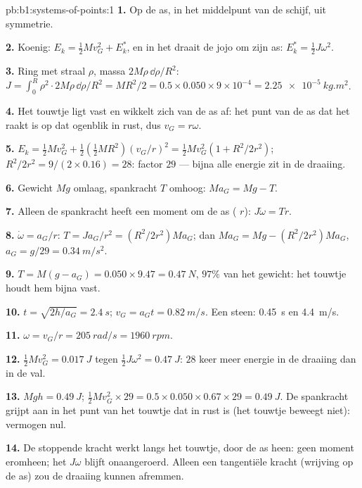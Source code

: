 \begin{solution}{pb:b1:systems-of-points:1}
\textbf{1.} Op de as, in het middelpunt van de schijf, uit symmetrie.

\textbf{2.} Koenig: $E_k = \tfrac12 Mv_G^2 + E_k^*$, en in het  draait de jojo om zijn as: $E_k^* = \tfrac12 J\omega^2$.

\textbf{3.} Ring met straal $\rho$, massa $2M\rho\,\dd\rho/R^2$: $J = \int_0^R
\rho^2\cdot 2M\rho\,\dd\rho/R^2 = MR^2/2 = 0.5 \times 0.050 \times 9\times10^{-4}
= \qty{2.25e-5}{kg.m^2}$.

\textbf{4.} Het touwtje ligt vast en wikkelt zich van de as af: het punt van
de as dat het raakt is op dat ogenblik in rust, dus $v_G = r\omega$.

\textbf{5.} $E_k = \tfrac12 Mv_G^2 + \tfrac12(\tfrac12 MR^2)(v_G/r)^2 = \tfrac12
Mv_G^2(1 + R^2/2r^2)$; $R^2/2r^2 = 9/(2 \times 0.16) = 28$: factor $29$ ---
bijna alle energie zit in de draaiing.

\textbf{6.} Gewicht $Mg$ omlaag, spankracht $T$ omhoog: $Ma_G = Mg - T$.

\textbf{7.} Alleen de spankracht heeft een moment om de as ( $r$):
$J\dot\omega = Tr$.

\textbf{8.} $\dot\omega = a_G/r$: $T = Ja_G/r^2 = (R^2/2r^2)Ma_G$; dan
$Ma_G = Mg - (R^2/2r^2)Ma_G$, $a_G = g/29 = \qty{0.34}{m/s^2}$.

\textbf{9.} $T = M(g - a_G) = 0.050 \times 9.47 = \qty{0.47}{N}$, $97\%$ van
het gewicht: het touwtje houdt hem bijna vast.

\textbf{10.} $t = \sqrt{2h/a_G} = \qty{2.4}{s}$; $v_G = a_Gt = \qty{0.82}{m/s}$.
Een steen: \qty{0.45}{s} en \qty{4.4}{m/s}.

\textbf{11.} $\omega = v_G/r = \qty{205}{rad/s} = \qty{1960}{rpm}$.

\textbf{12.} $\tfrac12 Mv_G^2 = \qty{0.017}{J}$ tegen $\tfrac12 J\omega^2 =
\qty{0.47}{J}$: $28$ keer meer energie in de draaiing dan in de val.

\textbf{13.} $Mgh = \qty{0.49}{J}$; $\tfrac12 Mv_G^2 \times 29 = 0.5 \times 0.050
\times 0.67 \times 29 = \qty{0.49}{J}$. De spankracht grijpt aan in het punt van
het touwtje dat in rust is (het touwtje beweegt niet): vermogen nul.

\textbf{14.} De stoppende kracht werkt langs het touwtje, door de as heen:
geen moment eromheen; het  $J\omega$ blijft onaangeroerd. Alleen een
tangentiële kracht (wrijving op de as) zou de draaiing kunnen afremmen.


\end{solution}
